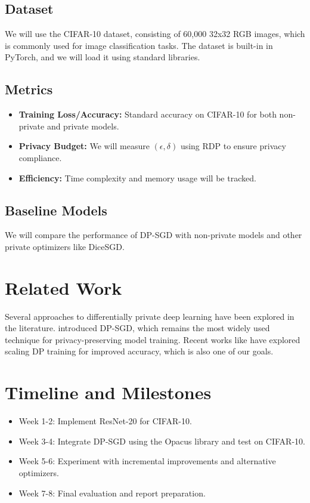 \documentclass{article}
\begin{document}
\subsection{Dataset}
We will use the CIFAR-10 dataset, consisting of 60,000 32x32 RGB images, which is commonly used for image classification tasks. The dataset is built-in in PyTorch, and we will load it using standard libraries.

\subsection{Metrics}
\begin{itemize}
    \item \textbf{Training Loss/Accuracy:} Standard accuracy on CIFAR-10 for both non-private and private models.
    \item \textbf{Privacy Budget:} We will measure $(\epsilon, \delta)$ using RDP to ensure privacy compliance.
    \item \textbf{Efficiency:} Time complexity and memory usage will be tracked.
\end{itemize}

\subsection{Baseline Models}
We will compare the performance of DP-SGD with non-private models and other private optimizers like DiceSGD. 

\section{Related Work}
Several approaches to differentially private deep learning have been explored in the literature. \citet{abadi2016deep} introduced DP-SGD, which remains the most widely used technique for privacy-preserving model training. Recent works like \citet{de2022unlocking} have explored scaling DP training for improved accuracy, which is also one of our goals.

\section{Timeline and Milestones}
\begin{itemize}
    \item Week 1-2: Implement ResNet-20 for CIFAR-10.
    \item Week 3-4: Integrate DP-SGD using the Opacus library and test on CIFAR-10.
    \item Week 5-6: Experiment with incremental improvements and alternative optimizers.
    \item Week 7-8: Final evaluation and report preparation.
\end{itemize}
\end{document}
